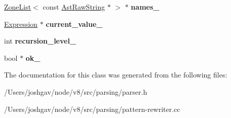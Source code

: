 \begin{DoxyCompactItemize}
\item 
\hyperlink{classv8_1_1internal_1_1_zone_list}{Zone\+List}$<$ const \hyperlink{classv8_1_1internal_1_1_ast_raw_string}{Ast\+Raw\+String} $\ast$ $>$ $\ast$ {\bfseries names\+\_\+}\hypertarget{classv8_1_1internal_1_1_parser_1_1_pattern_rewriter_ad1b254bc76e3001ac195f05e78e8fdda}{}\label{classv8_1_1internal_1_1_parser_1_1_pattern_rewriter_ad1b254bc76e3001ac195f05e78e8fdda}

\item 
\hyperlink{classv8_1_1internal_1_1_expression}{Expression} $\ast$ {\bfseries current\+\_\+value\+\_\+}\hypertarget{classv8_1_1internal_1_1_parser_1_1_pattern_rewriter_ad41a482bb1f175d7d1499f6cbd24c8b2}{}\label{classv8_1_1internal_1_1_parser_1_1_pattern_rewriter_ad41a482bb1f175d7d1499f6cbd24c8b2}

\item 
int {\bfseries recursion\+\_\+level\+\_\+}\hypertarget{classv8_1_1internal_1_1_parser_1_1_pattern_rewriter_ade21bd16388a42d73467f45d582de068}{}\label{classv8_1_1internal_1_1_parser_1_1_pattern_rewriter_ade21bd16388a42d73467f45d582de068}

\item 
bool $\ast$ {\bfseries ok\+\_\+}\hypertarget{classv8_1_1internal_1_1_parser_1_1_pattern_rewriter_ae1434d6ec22e11fe6ba0a970e636e3fa}{}\label{classv8_1_1internal_1_1_parser_1_1_pattern_rewriter_ae1434d6ec22e11fe6ba0a970e636e3fa}

\end{DoxyCompactItemize}


The documentation for this class was generated from the following files\+:\begin{DoxyCompactItemize}
\item 
/\+Users/joshgav/node/v8/src/parsing/parser.\+h\item 
/\+Users/joshgav/node/v8/src/parsing/pattern-\/rewriter.\+cc\end{DoxyCompactItemize}
